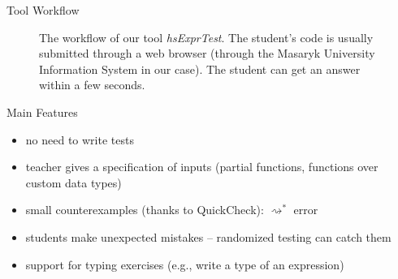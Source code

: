 \documentclass[final, 20pt, a0]{beamer}
\newlength{\twocolwid}
\newcommand{\hsExprTest}{\textit{hsExprTest}}
\begin{document}
\begin{frame}[t,fragile]
\begin{columns}[t]
\begin{column}{\twocolwid}
\begin{block}{Tool Workflow}
\begin{figure}[h]
\begin{center}
        \end{center}

        \caption{%
            The workflow of our tool \hsExprTest{}.
            The student's code is usually submitted through a web browser (through the Masaryk University Information System in our case).
            The student can get an answer within a few seconds.
        }
    \end{figure}

\end{block}

\begin{block}{Main Features}
  \begin{itemize}
    \item no need to write tests
    \item teacher gives a specification of inputs (partial functions, functions over custom data types)
    \item small counterexamples (thanks to QuickCheck):  $\rightsquigarrow^*$ error
    \item students make unexpected mistakes -- randomized testing can catch them
    \item support for typing exercises (e.g., write a type of an expression)
  \end{itemize}
\end{block}


\end{column}
\end{columns}
\end{frame}
\end{document}
